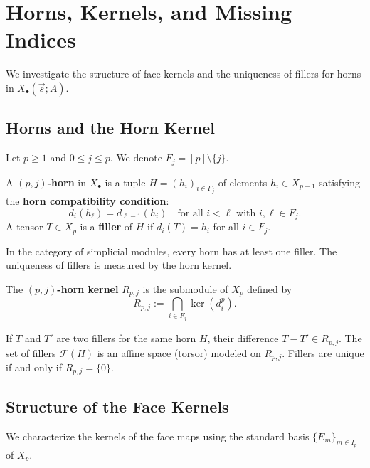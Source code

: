 \section{Horns, Kernels, and Missing Indices}
\label{sec:horns}

We investigate the structure of face kernels and the uniqueness of fillers for horns in $X_\bullet(\vec{s};A)$.

\subsection{Horns and the Horn Kernel}

Let $p\ge 1$ and $0\le j\le p$. We denote $F_j = [p] \setminus \{j\}$.

\begin{definition}
A \textbf{$(p,j)$-horn} in $X_\bullet$ is a tuple $H = (h_i)_{i \in F_j}$ of elements $h_i \in X_{p-1}$ satisfying the \textbf{horn compatibility condition}:
\[
d_i(h_\ell) = d_{\ell-1}(h_i) \quad \text{for all } i < \ell \text{ with } i, \ell \in F_j.
\]
A tensor $T\in X_p$ is a \textbf{filler} of $H$ if $d_i(T) = h_i$ for all $i\in F_j$.
\end{definition}

In the category of simplicial modules, every horn has at least one filler. The uniqueness of fillers is measured by the horn kernel.

\begin{definition}
The \textbf{$(p,j)$-horn kernel} $R_{p,j}$ is the submodule of $X_p$ defined by
\[
R_{p,j} := \bigcap_{i \in F_j} \ker(d_i^p).
\]
\end{definition}

If $T$ and $T'$ are two fillers for the same horn $H$, their difference $T-T' \in R_{p,j}$. The set of fillers $\mathcal{F}(H)$ is an affine space (torsor) modeled on $R_{p,j}$. Fillers are unique if and only if $R_{p,j} = \{0\}$.

\subsection{Structure of the Face Kernels}

We characterize the kernels of the face maps using the standard basis $\{E_m\}_{m\in I_p}$ of $X_p$.


